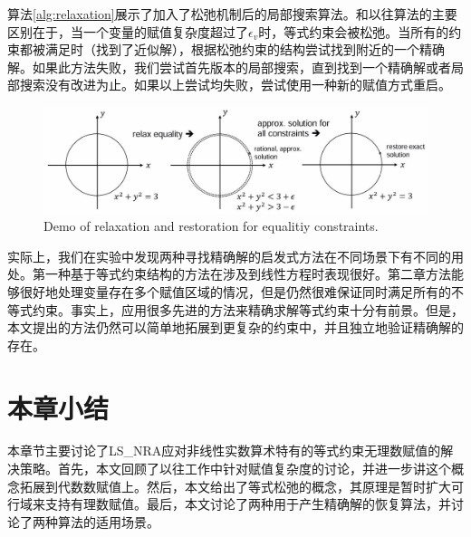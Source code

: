 算法\ref{alg:relaxation}展示了加入了松弛机制后的局部搜索算法。和以往算法的主要区别在于，当一个变量的赋值复杂度超过了$\epsilon_v$时，等式约束会被松弛。当所有的约束都被满足时（找到了近似解），根据松弛约束的结构尝试找到附近的一个精确解。如果此方法失败，我们尝试首先版本的局部搜索，直到找到一个精确解或者局部搜索没有改进为止。如果以上尝试均失败，尝试使用一种新的赋值方式重启。

\begin{figure}[t]
    \centering
    \includegraphics[width=\columnwidth]{Img/relax.jpg}
     {Demo of relaxation and restoration for equalitiy constraints.}
\label{fig:relaxation}
\end{figure}

实际上，我们在实验中发现两种寻找精确解的启发式方法在不同场景下有不同的用处。第一种基于等式约束结构的方法在涉及到线性方程时表现很好。第二章方法能够很好地处理变量存在多个赋值区域的情况，但是仍然很难保证同时满足所有的不等式约束。事实上，应用很多先进的方法来精确求解等式约束十分有前景\cite{CimattiGLS22, LiXZ23b}。但是，本文提出的方法仍然可以简单地拓展到更复杂的约束中，并且独立地验证精确解的存在。

\section{本章小结}
本章节主要讨论了LS\_NRA应对非线性实数算术特有的等式约束无理数赋值的解决策略。首先，本文回顾了以往工作中针对赋值复杂度的讨论，并进一步讲这个概念拓展到代数数赋值上。然后，本文给出了等式松弛的概念，其原理是暂时扩大可行域来支持有理数赋值。最后，本文讨论了两种用于产生精确解的恢复算法，并讨论了两种算法的适用场景。

